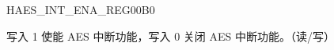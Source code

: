 \begin{register}{H}{AES\_INT\_ENA\_REG}{\hexprefix{}00B0}\label{regdesc:AESINTENAREG}
%
%
\regnewline%
\begin{regdesc}\begin{reglist}
\item [AES\_INT\_ENA] 写入 1 使能 AES 中断功能，写入 0 关闭 AES 中断功能。（读/写）
\end{reglist}\end{regdesc}
\end{register}